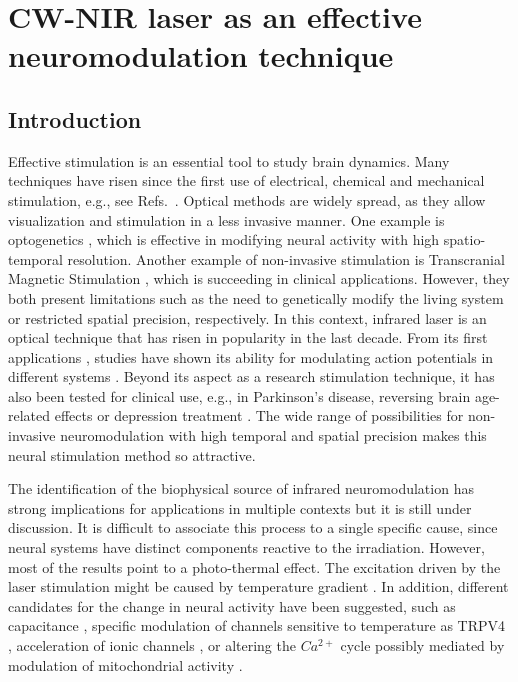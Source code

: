 \chapter{CW-NIR laser as an effective neuromodulation technique}
\section{Introduction}

Effective  stimulation is an essential tool to study brain dynamics. Many techniques have risen since the first use of  electrical, chemical and mechanical stimulation, e.g., see Refs.~. Optical methods are widely spread, as they allow visualization \cite{Lecoq9042} and stimulation in a less invasive manner. One example is optogenetics \cite{Boyden2005, Yizhar2011, Tye2012,bansal2022towards}, which is effective in modifying neural activity with high spatio-temporal resolution. Another example of non-invasive stimulation is Transcranial Magnetic Stimulation \cite{Valero2017transcranial}, which is succeeding in clinical applications. However, they both present limitations such as the need to genetically modify the living system or restricted spatial precision, respectively. In this context, infrared laser is an optical technique that has risen in popularity in the last decade. From its first applications \cite{Wells2005, Izzo2007}, studies have shown its ability for modulating action potentials in different systems \cite{Liang2009, Goyal2012, Brown2020, Barrett2018, Shapiro2012, Cayce2014, Begeng2022}. Beyond its aspect as a research stimulation technique, it has also been tested for clinical use, e.g., in Parkinson's disease, reversing brain age-related effects or depression treatment \cite{Konstantinovic2013, DISNER2016780, Wang2017, Saucedo2021, Pan2023}. The wide range of possibilities for non-invasive neuromodulation with high temporal and spatial precision makes this neural stimulation method so attractive. 
 
The identification of the biophysical source of infrared neuromodulation has strong implications for applications in multiple contexts but it is still under discussion. It is difficult to associate this process to a single specific cause, since neural systems have distinct components reactive to the irradiation. However, most of the results point to a photo-thermal effect. The excitation driven by the laser stimulation might be caused by temperature gradient \cite{Wells2007}. In addition, different candidates for the change in neural activity have been suggested, such as capacitance \cite{Shapiro2012, Plaksin2018}, specific modulation of channels sensitive to temperature as TRPV4 \cite{Albert2012}, acceleration of ionic channels \cite{Liang2009}, or altering the $Ca^{2+}$ cycle possibly mediated by modulation of mitochondrial activity \cite{Dittami2011, Lumbreras2014, Saucedo2021}.

